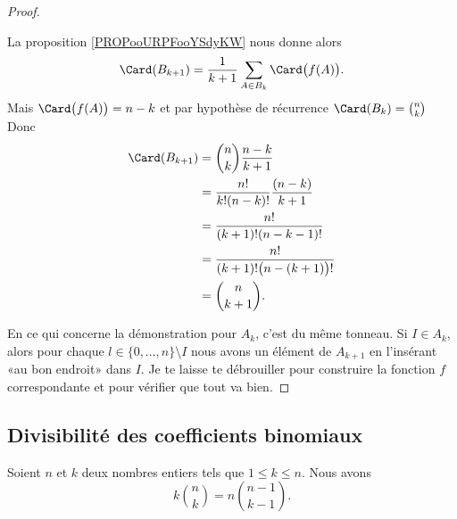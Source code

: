 \begin{proof}
\begin{subproof}
		La proposition \ref{PROPooURPFooYSdyKW} nous donne alors
		\begin{equation}
			\Card(B_{k+1})=\frac{1}{ k+1}\sum_{A\in B_k}\Card\big( f(A) \big).
		\end{equation}
		Mais \( \Card\big( f(A) \big)=n-k\) et par hypothèse de récurrence \( \Card(B_k)={n\choose k}\) Donc
		\begin{subequations}
			\begin{align}
				\Card(B_{k+1}) & =\binom{ n }{ k }\frac{ n-k }{ k+1 }           \\
				               & = \frac{ n! }{ k!(n-k)! }\frac{ (n-k) }{ k+1 } \\
				               & =\frac{ n! }{ (k+1)!(n-k-1)! }                 \\
				               & =\frac{ n! }{ (k+1)!\big( n-(k+1) \big)! }     \\
				               & =\binom{ n }{ k+1 }.
			\end{align}
		\end{subequations}
	\end{subproof}

	En ce qui concerne la démonstration pour \( A_k\), c'est du même tonneau. Si \( I\in A_k\), alors pour chaque \( l\in \{ 0,\ldots,n \}\setminus I\) nous avons un élément de \( A_{k+1}\) en l'insérant «au bon endroit» dans \( I\). Je te laisse te débrouiller pour construire la fonction \( f\) correspondante et pour vérifier que tout va bien.
\end{proof}


\subsection{Divisibilité des coefficients binomiaux}

\begin{lemma}	\label{LEMooYBOIooEtVfDQ}
	Soient \( n\) et \( k\) deux nombres entiers tels que \( 1\leq k\leq n\). Nous avons
	\begin{equation}		\label{EQooDNBYooZfJEAe}
		k\binom{ n }{ k }=n\binom{ n-1 }{ k-1 }.
	\end{equation}
\end{lemma}

